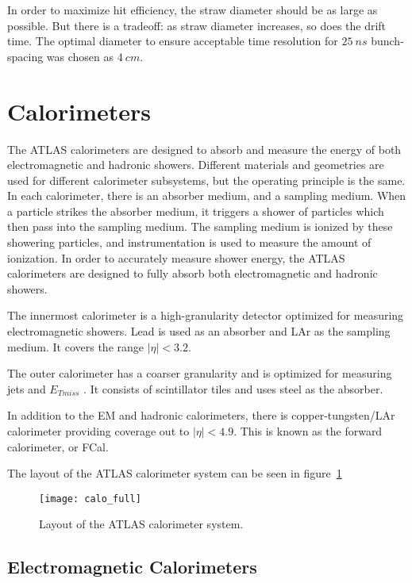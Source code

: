 In order to maximize hit efficiency, the straw diameter should be as large as possible.
But there is a tradeoff: as straw diameter increases, so does the drift time.
The optimal diameter to ensure acceptable time resolution for $25~ns$ bunch-spacing was chosen as $4~cm$.\cite{trt-2013}

\section{Calorimeters}\label{sec:calorimeters}

The ATLAS calorimeters are designed to absorb and measure the energy of both electromagnetic and hadronic showers.
Different materials and geometries are used for different calorimeter subsystems, but the operating principle is the same.
In each calorimeter, there is an absorber medium, and a sampling medium.
When a particle strikes the absorber medium, it triggers a shower of particles which then pass into the sampling medium.
The sampling medium is ionized by these showering particles, and instrumentation is used to measure the amount of ionization.
In order to accurately measure shower energy, the ATLAS calorimeters are designed to fully absorb both electromagnetic and hadronic showers.

The innermost calorimeter is a high-granularity detector optimized for measuring electromagnetic showers.
Lead is used as an absorber and LAr as the sampling medium.
It covers the range $|\eta| < 3.2$.

The outer calorimeter has a coarser granularity and is optimized for measuring jets and $E_{T miss}$ .
It consists of scintillator tiles and uses steel as the absorber.

In addition to the EM and hadronic calorimeters, there is copper-tungsten/LAr calorimeter providing coverage out to
$|\eta| < 4.9$.
This is known as the forward calorimeter, or FCal.

The layout of the ATLAS calorimeter system can be seen in figure~\ref{fig:calo_full}

\begin{figure}[!ht]\centering
\texttt{[image: calo\_full]}
\caption{Layout of the ATLAS calorimeter system.}
\label{fig:calo_full}\cite{atlas-detector-2008}
\end{figure}

\subsection{Electromagnetic Calorimeters}\label{subsec:em_cal}

